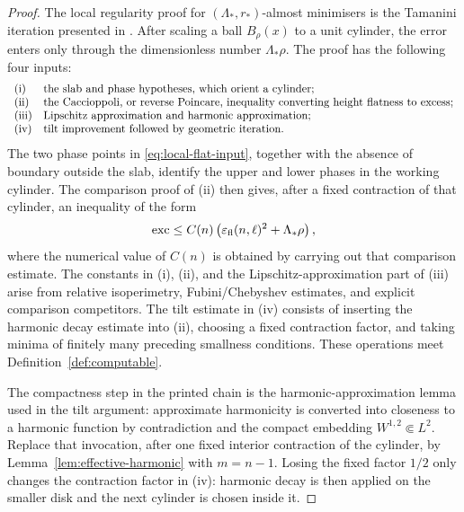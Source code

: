 \documentclass[11pt]{amsart}
\theoremstyle{definition}
\begin{document}
\begin{proof}
The local regularity proof for \((\Lambda_*,r_*)\)-almost minimisers is
the Tamanini iteration presented in
\cite[Theorems 24.1, 24.2, 25.1, 25.3, and 26.3]{Maggi}.
After scaling a ball \(B_\rho(x)\) to a unit cylinder, the error enters
only through the dimensionless number \(\Lambda_*\rho\).  The proof has
the following four inputs:
\[
\begin{array}{ll}
\textnormal{(i)} & \text{the slab and phase hypotheses, which orient a
                       cylinder;}\\
\textnormal{(ii)}& \text{the Caccioppoli, or reverse Poincare, inequality
                       converting height flatness to excess;}\\
\textnormal{(iii)}&\text{Lipschitz approximation and harmonic
                       approximation;}\\
\textnormal{(iv)}& \text{tilt improvement followed by geometric iteration.}
\end{array}
\]
The two phase points in \eqref{eq:local-flat-input}, together with the
absence of boundary outside the slab, identify the upper and lower
phases in the working cylinder.  The comparison proof of (ii) then gives,
after a fixed contraction of that cylinder, an inequality of the form
\[
   \operatorname{exc}
      \le C(n)\left(\varepsilon_{\rm fl}(n,\ell)^2
                    +\Lambda_*\rho\right),
\]
where the numerical value of \(C(n)\) is obtained by carrying out that
comparison estimate.  The constants in (i), (ii), and the
Lipschitz-approximation part of (iii) arise from relative isoperimetry,
Fubini/Chebyshev estimates, and explicit comparison competitors.  The
tilt estimate in (iv) consists
of inserting the harmonic decay estimate into (ii), choosing a fixed
contraction factor, and taking minima of finitely many preceding
smallness conditions.  These operations meet
Definition~\ref{def:computable}.

The compactness step in the printed chain is the harmonic-approximation
lemma used in the tilt argument: approximate harmonicity is converted
into closeness to a harmonic function by contradiction and the compact
embedding \(W^{1,2}\Subset L^2\).  Replace that invocation, after one
fixed interior contraction of the cylinder, by
Lemma~\ref{lem:effective-harmonic} with \(m=n-1\).  Losing the fixed
factor \(1/2\) only changes the contraction factor in (iv): harmonic
decay is then applied on the smaller disk and the next cylinder is
chosen inside it.


\end{proof}
\end{document}
